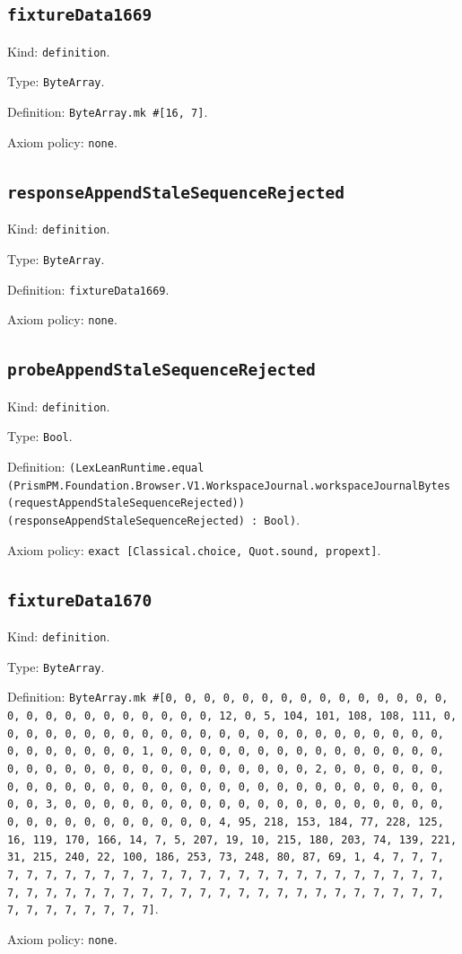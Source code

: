 \documentclass[11pt]{article}
\begin{document}
\subsection*{\texttt{fixtureData1669}}
\noindent Kind: \texttt{definition}.\par
\noindent Type: \texttt{ByteArray}.\par
\noindent Definition: \texttt{ByteArray.mk \#[16, 7]}.\par
\noindent Axiom policy: \texttt{none}.\par
\subsection*{\texttt{responseAppendStaleSequenceRejected}}
\noindent Kind: \texttt{definition}.\par
\noindent Type: \texttt{ByteArray}.\par
\noindent Definition: \texttt{fixtureData1669}.\par
\noindent Axiom policy: \texttt{none}.\par
\subsection*{\texttt{probeAppendStaleSequenceRejected}}
\noindent Kind: \texttt{definition}.\par
\noindent Type: \texttt{Bool}.\par
\noindent Definition: \texttt{(LexLeanRuntime.equal (PrismPM.Foundation.Browser.V1.WorkspaceJournal.workspaceJournalBytes (requestAppendStaleSequenceRejected)) (responseAppendStaleSequenceRejected) : Bool)}.\par
\noindent Axiom policy: \texttt{exact [Classical.choice, Quot.sound, propext]}.\par
\subsection*{\texttt{fixtureData1670}}
\noindent Kind: \texttt{definition}.\par
\noindent Type: \texttt{ByteArray}.\par
\noindent Definition: \texttt{ByteArray.mk \#[0, 0, 0, 0, 0, 0, 0, 0, 0, 0, 0, 0, 0, 0, 0, 0, 0, 0, 0, 0, 0, 0, 0, 0, 0, 0, 12, 0, 5, 104, 101, 108, 108, 111, 0, 0, 0, 0, 0, 0, 0, 0, 0, 0, 0, 0, 0, 0, 0, 0, 0, 0, 0, 0, 0, 0, 0, 0, 0, 0, 0, 0, 0, 0, 0, 1, 0, 0, 0, 0, 0, 0, 0, 0, 0, 0, 0, 0, 0, 0, 0, 0, 0, 0, 0, 0, 0, 0, 0, 0, 0, 0, 0, 0, 0, 0, 0, 2, 0, 0, 0, 0, 0, 0, 0, 0, 0, 0, 0, 0, 0, 0, 0, 0, 0, 0, 0, 0, 0, 0, 0, 0, 0, 0, 0, 0, 0, 0, 0, 3, 0, 0, 0, 0, 0, 0, 0, 0, 0, 0, 0, 0, 0, 0, 0, 0, 0, 0, 0, 0, 0, 0, 0, 0, 0, 0, 0, 0, 0, 0, 0, 4, 95, 218, 153, 184, 77, 228, 125, 16, 119, 170, 166, 14, 7, 5, 207, 19, 10, 215, 180, 203, 74, 139, 221, 31, 215, 240, 22, 100, 186, 253, 73, 248, 80, 87, 69, 1, 4, 7, 7, 7, 7, 7, 7, 7, 7, 7, 7, 7, 7, 7, 7, 7, 7, 7, 7, 7, 7, 7, 7, 7, 7, 7, 7, 7, 7, 7, 7, 7, 7, 7, 7, 7, 7, 7, 7, 7, 7, 7, 7, 7, 7, 7, 7, 7, 7, 7, 7, 7, 7, 7, 7, 7, 7, 7]}.\par
\noindent Axiom policy: \texttt{none}.\par
\end{document}
